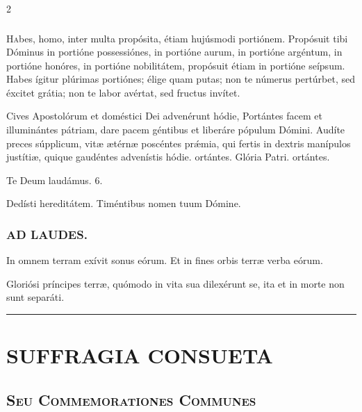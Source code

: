 \documentclass[9pt,twoside]{extarticle}
\begin{document}
\begin{multicols}{2}
\subsubsection*{\center {}}
\lettrine{H}abes, homo, inter multa propósita, étiam hujúsmodi portiónem. Propósuit tibi Dóminus in portióne possessiónes, in portióne aurum, in portióne argéntum, in portióne honóres, in portióne nobilitátem, propósuit étiam in portióne seípsum. Habes ígitur plúrimas portiónes; élige quam putas; non te númerus pertúrbet, sed éxcitet grátia; non te labor avértat, sed fructus invítet.

\begin{tightlist}{}
\item {} Cives Apostolórum et doméstici Dei advenérunt hódie, \textred{*} Portántes facem et illuminántes pátriam, dare pacem géntibus et liberáre pópulum Dómini.  Audíte preces súpplicum, vitæ ætérnæ poscéntes prǽmia, qui fertis in dextris manípulos justítiæ, quique gaudéntes advenístis hódie. ortántes. Glória Patri. ortántes.
\item Te Deum laudámus. 6.
\item {} Dedísti hereditátem.  Timéntibus nomen tuum Dómine.
\end{tightlist}

\subsubsection*{\center \textsc{AD LAUDES.}}
\begin{tightlist}{}
\item {} In omnem terram exívit sonus eórum.  Et in fines orbis terræ verba eórum.
\item {} Gloriósi príncipes terræ, quómodo in vita sua dilexérunt se, ita et in morte non sunt separáti.
\end{tightlist}

\begin{center}\textcolor{red}{\rule{\linewidth}{0.5pt}} \end{center}
\clearpage
\section*{\center \textsc{SUFFRAGIA CONSUETA}}
\subsection*{\center \textsc{Seu Commemorationes Communes}}


\end{multicols}
\end{document}
